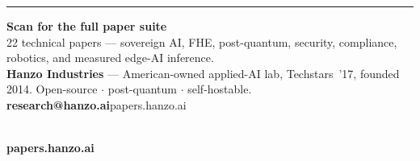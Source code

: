 \documentclass[9pt,letterpaper]{extarticle}
\newcommand{\rulen}{\textcolor{hzrule}{\rule{\linewidth}{0.7pt}}}
\begin{document}
\vfill
\rulen\vspace{3pt}
\noindent\begin{minipage}[b]{0.70\linewidth}
{\large\textbf{Scan for the full paper suite}}\\[2pt]
\textcolor{hzgray}{22 technical papers --- sovereign AI, FHE, post-quantum, security, compliance, robotics, and measured edge-AI inference.}\\[5pt]
{\footnotesize\textcolor{hzgray}{\textbf{Hanzo Industries} --- American-owned applied-AI lab, Techstars~'17, founded 2014.
Open-source $\cdot$ post-quantum $\cdot$ self-hostable.}\\[2pt]
\textbf{research@hanzo.ai}\quad\textcolor{hzgray}{papers.hanzo.ai}}
\end{minipage}\hfill
\begin{minipage}[b]{0.26\linewidth}
\raggedleft
{}\\[3pt]
{\footnotesize\textbf{papers.hanzo.ai}}
\end{minipage}
\end{document}
